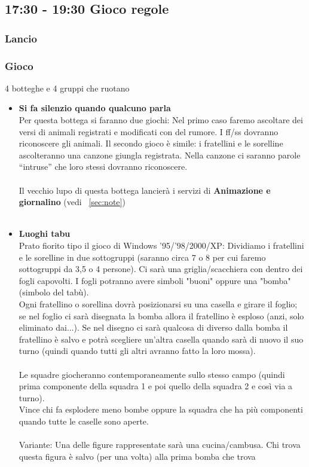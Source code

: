 \documentclass[../main.tex]{subfiles}
\begin{document}
    \subsection{17:30 - 19:30 Gioco regole}
       \subsubsection{Lancio}
        \subsubsection{Gioco}
        4 botteghe e 4 gruppi che ruotano
        
        \begin{itemize}
            \item   \textbf{Si fa silenzio quando qualcuno parla}\\
                    Per questa bottega si faranno due giochi: Nel primo caso faremo ascoltare dei versi di animali registrati e modificati con del rumore. I ff/ss dovranno riconoscere gli animali.
Il secondo gioco è simile: i fratellini e le sorelline ascolteranno una canzone giungla registrata. Nella canzone ci saranno parole “intruse” che loro stessi dovranno riconoscere.\\
            \\
            Il vecchio lupo di questa bottega lancierà i servizi di \textbf{Animazione e giornalino} (vedi ~\ref{sec:note})\\
            \\
            \item  \textbf{Luoghi tabu}\\
            Prato fiorito tipo il gioco di Windows '95/'98/2000/XP:
            Dividiamo i fratellini e le sorelline in due sottogruppi (saranno circa 7 o 8 per cui faremo sottogruppi da 3,5 o 4 persone).
            Ci sarà una griglia/scacchiera con dentro dei fogli capovolti. I fogli potranno avere simboli "buoni" oppure una "bomba" (simbolo del tabù).\\Ogni fratellino o sorellina dovrà posizionarsi su una casella e girare il foglio; se nel foglio ci sarà disegnata la bomba allora il fratellino è esploso (anzi, solo eliminato dai...). Se nel disegno ci sarà qualcosa di diverso dalla bomba il fratellino è salvo e potrà scegliere un'altra casella quando sarà di nuovo il suo turno (quindi quando tutti gli altri avranno fatto la loro mossa).\\
            \\
            Le squadre giocheranno contemporaneamente sullo stesso campo (quindi prima componente della squadra 1 e poi quello della squadra 2 e così via a turno).\\
            Vince chi fa esplodere meno bombe oppure la squadra che ha più componenti quando tutte le caselle sono aperte.\\
            \\
            Variante: Una delle figure rappresentate sarà una cucina/cambusa. Chi trova questa figura è salvo (per una volta) alla prima bomba che trova
            

\end{itemize}
\end{document}
